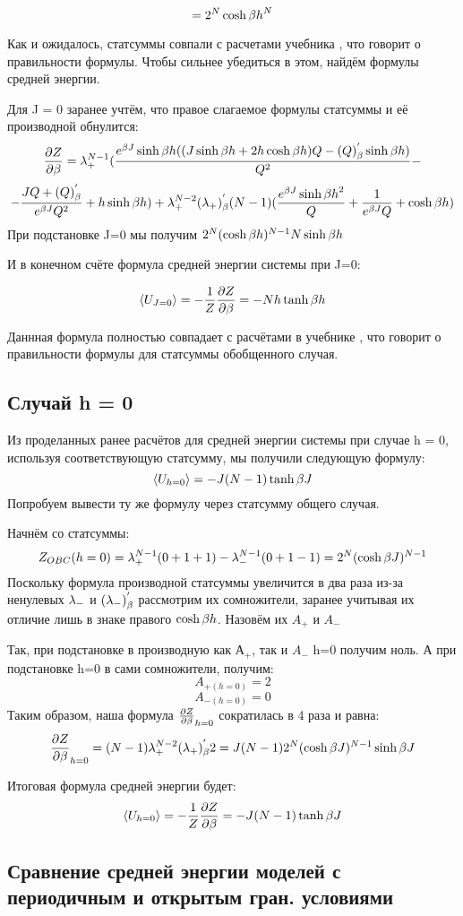 \[= 2^{N}\cosh{\beta h}^{N}\]

Как и ожидалось, статсуммы совпали с расчетами учебника \cite{Swen}, что говорит о правильности формулы. Чтобы сильнее убедиться в этом, найдём формулы средней энергии. 

Для J = 0 заранее учтём, что правое слагаемое формулы статсуммы и её производной обнулится:
\[\frac{\partial Z}{\partial \beta} = \lambda_{+}^{N-1}(\frac{e^{\beta J}\sinh{\beta h}((J\sinh{\beta h} + 2h\cosh{\beta h})Q - (Q)^{'}_{\beta}\sinh{\beta h})}{Q^{2}} - \]
\[ - \frac{J Q + (Q)^{'}_{\beta}}{e^{\beta J} Q^{2}} + h\sinh{\beta h}) + \lambda_{+}^{N-2} (\lambda_{+})^{'}_{\beta}(N-1)(\frac{e^{\beta J} \sinh{\beta h}^2}{Q} + \frac{1}{e^{\beta J}Q} + \cosh{\beta h})\]
При подстановке J=0 мы получим $2^{N}(\cosh{\beta h})^{N-1}N\sinh{\beta h}$

И в конечном счёте формула средней энергии системы при J=0: 

\[\langle U_{J = 0} \rangle = - \frac{1}{Z} \frac{\partial Z}{\partial \beta} = - N h\tanh{\beta h}\]

Даннная формула полностью совпадает с расчётами в учебнике \cite{Swen}, что говорит о правильности формулы для статсуммы обобщенного случая.

\subsection{Случай h = 0}

Из проделанных ранее расчётов для средней энергии системы при случае h = 0, используя соответствующую статсумму, мы получили следующую формулу:
\[ \langle U_{h = 0} \rangle = - J(N - 1)\tanh{\beta J} \]
Попробуем вывести ту же формулу через статсумму общего случая.

Начнём со статсуммы:
\[ Z_{OBC}(h=0) = \lambda_{+}^{N-1}(0 + 1 + 1) - \lambda_{-}^{N-1}(0 + 1 - 1) = 2^{N}(\cosh{\beta J})^{N-1}\]
Поскольку формула производной статсуммы увеличится в два раза из-за ненулевых $\lambda_{-}$ и $(\lambda_{-})^{'}_{\beta}$ рассмотрим их сомножители, заранее учитывая их отличие лишь в знаке правого $\cosh{\beta h}$. Назовём их $A_{+}$ и $A_{-}$

Так, при подстановке в производную как $А_{+}$, так и $A_{-}$  h=0 получим ноль. А при подстановке h=0 в сами сомножители, получим:
\[A_{+(h=0)} = 2\]
\[A_{-(h=0)} = 0\]
Таким образом, наша формула $\frac{\partial Z}{\partial \beta}_{h=0}$ сократилась в 4 раза и равна:
\[ \frac{\partial Z}{\partial \beta}_{h=0} = (N-1)\lambda_{+}^{N-2}(\lambda_{+})^{'}_{\beta}2 = J(N-1)2^{N}(\cosh{\beta J})^{N-1}\sinh{\beta J}\]

Итоговая формула средней энергии будет:
\[ \langle U_{h=0} \rangle = - \frac{1}{Z} \frac{\partial Z}{\partial \beta} = - J (N - 1) \tanh{\beta J}\]

\subsection{Сравнение средней энергии моделей с периодичным и открытым гран. условиями}

